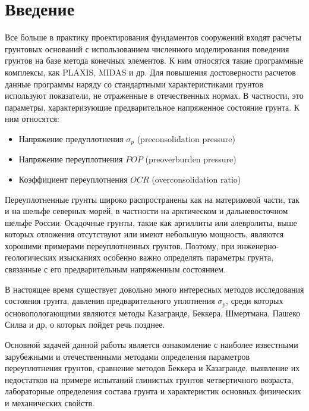 \chapter*{Введение}                         %

Все больше в практику проектирования фундаментов сооружений входят расчеты грунтовых оснований с использованием численного моделирования поведения грунтов на базе метода конечных элементов. К ним относятся такие программные комплексы, как PLAXIS, MIDAS и др. Для повышения достоверности расчетов данные программы наряду со стандартными характеристиками грунтов используют показатели, не отраженные в отечественных нормах. В частности, это параметры, характеризующие предварительное напряженное состояние грунта. К ним относятся:
\begin{itemize}
    \item Напряжение предуплотнения $\sigma_p$ (preconsolidation pressure)
    \item Напряжение переуплотнения $POP$ (preoverburden pressure)
    \item Коэффициент переуплотнения $OCR$ (overconsolidation ratio)
\end{itemize}

Переуплотненные грунты широко распространены как на материковой части, так и на шельфе северных морей, в частности на арктическом и дальневосточном шельфе России.
 Осадочные грунты, такие как аргиллиты или алевролиты, выше которых отложения отсутствуют или имеют небольшую мощность, являются хорошими примерами переуплотненных грунтов.
  Поэтому, при инженерно-геологических изысканиях особенно важно определять параметры грунта, связанные с его предварительным напряженным состоянием.


В настоящее время существует довольно много интересных методов исследования  состояния грунта, давления предварительного уплотнения $\sigma_p$, среди которых основопологающими являются методы Казагранде, Беккера, Шмертмана, Пашеко Силва и др, о которых пойдет речь позднее. 

Основной задачей данной работы является ознакомление с наиболее известными зарубежными и отечественными методами определения параметров переуплотнения грунтов, сравнение методов Беккера и Казагранде, выявление их недостатков на примере испытаний глинистых грунтов четвертичного возраста, лабораторные определения состава грунта и характеристик основных физических и механических свойств. 
 
